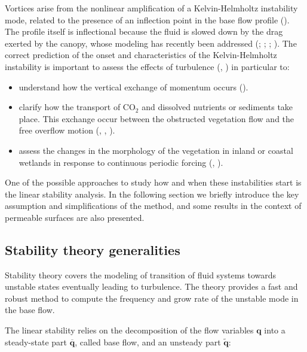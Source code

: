 Vortices arise from the nonlinear amplification of a Kelvin-Helmholtz instability mode, related to the presence of an inflection point in the base flow profile (\citet{asaeda2005morphological}). The profile itself is inflectional because the fluid is slowed down by the drag exerted by the canopy, whose modeling has recently been addressed (\citet{py2004mixing}; \citet{singh2016linear};  \citet{zampogna2016instability}; \citet{tilton2008linear}).
The correct prediction of the onset and characteristics of the Kelvin-Helmholtz instability is important to assess the effects of turbulence (\citet{finnigan2000turbulence}, \citet{jimenez2001turbulent}) in particular to:

\begin{itemize}
	\item understand how the vertical exchange of momentum occurs (\citet{ikeda1996three}).
	\item clarify how the transport of $\text{CO}_2$ and dissolved nutrients or sediments take place. This exchange occur between the
	obstructed vegetation flow and the free overflow motion (\citet{gambi1990flume}, \citet{eckman1987role}, \citet{grizzle1996hydrodynamically}).
	\item assess the changes in the morphology of the vegetation in inland or coastal wetlands in
	response to continuous periodic forcing (\citet{asaeda2005morphological}, \citet{patil2010characteristics}).
\end{itemize}

One of the possible approaches to study how and when these instabilities start is the linear stability analysis. In the following section we briefly introduce the key assumption and simplifications of the method, and some results in the context of permeable surfaces are also presented.


\subsection{Stability theory generalities}

Stability theory covers the modeling of transition of fluid systems towards unstable states eventually leading to turbulence.
The theory provides a fast and robust method to compute the frequency and grow rate of the unstable mode in the base flow.

The linear stability relies on the decomposition of the flow variables $\mathbf{q}$ into a steady-state part $\overline{\mathbf{q}}$, called base flow, and an unsteady part $\widetilde{\mathbf{q}}$:


